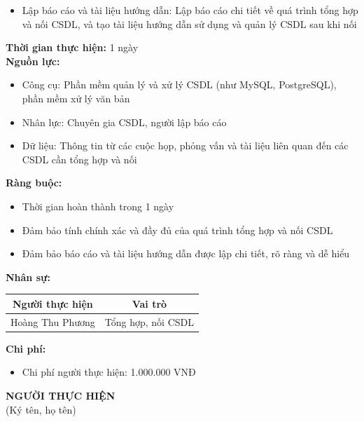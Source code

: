 {\begin{minipage}{\textwidth}
\begin{itemize}
        \item Lập báo cáo và tài liệu hướng dẫn: Lập báo cáo chi tiết về quá trình tổng hợp và nối CSDL, và tạo tài liệu hướng dẫn sử dụng và quản lý CSDL sau khi nối
    \end{itemize}
    \vspace{0.5cm}
    \noindent \textbf{Thời gian thực hiện:} 1 ngày \\
    \noindent \textbf{Nguồn lực:}
    \begin{itemize}
        \item Công cụ: Phần mềm quản lý và xử lý CSDL (như MySQL, PostgreSQL), phần mềm xử lý văn bản
        \item Nhân lực: Chuyên gia CSDL, người lập báo cáo
        \item Dữ liệu: Thông tin từ các cuộc họp, phỏng vấn và tài liệu liên quan đến các CSDL cần tổng hợp và nối
    \end{itemize}
    \vspace{0.5cm}
    \noindent \textbf{Ràng buộc:}
    \begin{itemize}
        \item Thời gian hoàn thành trong 1 ngày
        \item Đảm bảo tính chính xác và đầy đủ của quá trình tổng hợp và nối CSDL
        \item Đảm bảo báo cáo và tài liệu hướng dẫn được lập chi tiết, rõ ràng và dễ hiểu
    \end{itemize}
    \vspace{0.5cm}
    \noindent \textbf{Nhân sự:}
    \begin{longtable}{|c|c|}
    \hline
    \textbf{Người thực hiện} & \textbf{Vai trò} \\
    \hline
    Hoàng Thu Phương & Tổng hợp, nối CSDL \\
    \hline
    \end{longtable}
    \vspace{0.5cm}
    \noindent \textbf{Chi phí:}
    \begin{itemize}
        \item Chi phí người thực hiện: 1.000.000 VNĐ
    \end{itemize}
    \vspace{1cm}
    \begin{flushleft}
        \hspace{8cm} \textbf{NGƯỜI THỰC HIỆN} \\
        \hspace{8.8cm} (Ký tên, họ tên) \\
        \vspace{1cm}
    \end{flushleft}
    \end{minipage}
}
% 
